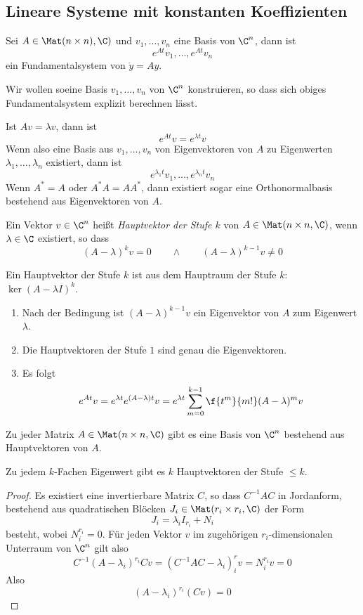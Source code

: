 \documentclass{mycourse}
\begin{document}
\subsection{Lineare Systeme mit konstanten Koeffizienten}


Sei $A\in \Mat(n\times n),\C)$ und $v_1,\dotsc,v_n$ eine Basis von $\C^n$, dann ist
\[
	e^{At}v_1, \dotsc, e^{At}v_n
\]
ein Fundamentalsystem von $\dot y= Ay$.

Wir wollen soeine Basis $v_1,\dotsc, v_n$ von $\C^n$ konstruieren, so dass sich obiges Fundamentalsystem explizit berechnen lässt.

Ist $Av = \lambda v$, dann ist
\[
	e^{At}v = e^{\lambda t}v
\]
Wenn also eine Basis aus $v_1,\dotsc, v_n$ von Eigenvektoren von $A$ zu Eigenwerten $\lambda_1,\dotsc, \lambda_n$ existiert, dann ist
\[
	e^{\lambda_1 t}v_1, \dotsc, e^{\lambda_n t}v_n
\]
Wenn $A^* = A$ oder $A^*A = AA^*$, dann existiert sogar eine Orthonormalbasis bestehend aus Eigenvektoren von $A$.

\begin{df*}
	Ein Vektor $v\in \C^n$ heißt \emph{Hauptvektor der Stufe $k$} von $A\in \Mat(n\times n,\C)$, wenn $\lambda \in \C$ existiert, so dass
	\[
		(A-\lambda)^kv = 0 \qquad \land \qquad (A-\lambda)^{k-1}v \neq 0
	\]
	\begin{note}
		Ein Hauptvektor der Stufe $k$ ist aus dem Hauptraum der Stufe $k$: $\ker(A-\lambda I)^k$.
	\end{note}
	\begin{note}
		\begin{enumerate}[1)]
			\item
				Nach der Bedingung ist $(A-\lambda)^{k-1}v$ ein Eigenvektor von $A$ zum Eigenwert $\lambda$.
			\item
				Die Hauptvektoren der Stufe $1$ sind genau die Eigenvektoren.
			\item
				Es folgt
				\[
					e^{At}v = e^{\lambda t}e^{(A-\lambda)t}v = e^{\lambda t} \sum_{m=0}^{k-1}\f{t^m}{m!}(A-\lambda)^m v
				\]
		\end{enumerate}
	\end{note}
\end{df*}


\begin{st}
	\label{17.12}
	Zu jeder Matrix $A\in \Mat(n\times n,\C)$ gibt es eine Basis von $\C^n$ bestehend aus Hauptvektoren von $A$.

	Zu jedem $k$-Fachen Eigenwert gibt es $k$ Hauptvektoren der Stufe $\le k$.
	\begin{proof}
		Es existiert eine invertierbare Matrix $C$, so dass $C^{-1}AC$ in Jordanform, bestehend aus quadratischen Blöcken $J_i\in \Mat(r_i\times r_i, \C)$ der Form
		\[
			J_i = \lambda_i I_{r_i} + N_i
		\]
		besteht, wobei $N_i^{r_i} = 0$.
		Für jeden Vektor $v$ im zugehörigen $r_i$-dimensionalen Unterraum von $\C^n$ gilt also
		\[
			C^{-1}(A-\lambda_i)^{r_i}Cv = (C^{-1}AC - \lambda_i)^r_i v = N_i^{r_i}v = 0
		\]
		Also
		\[
			(A-\lambda_i)^{r_i}(Cv) = 0
		\]
	\end{proof}
\end{st}
\end{document}
